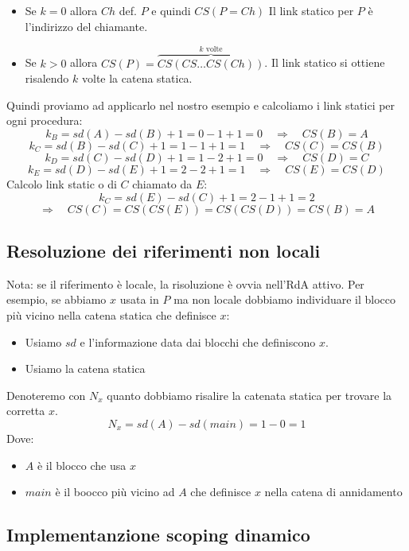 \documentclass[a4paper]{article}
\begin{document}
\begin{Example}{}{}
\begin{itemize}
\[  \]
  \begin{itemize}
    \item Se $k = 0$ allora $Ch$ def. $P$ e quindi $CS(P = Ch)$
    Il link statico per $P$ è l'indirizzo del chiamante.
    \item Se $k > 0$ allora $CS(P) = \overbrace{CS(CS \dots CS(Ch))}^{k \text{ volte}}$.
    Il link statico si ottiene risalendo $k$ volte la catena statica.
  \end{itemize}
\end{itemize}
Quindi proviamo ad applicarlo nel nostro esempio e calcoliamo i link statici 
per ogni procedura:
\[
  k_B = sd(A) - sd(B) + 1 = 0 - 1 + 1 = 0 \quad \Rightarrow \quad CS(B) = A
\]
\[
  k_C = sd(B) - sd(C) + 1 = 1 - 1 + 1 = 1 \quad \Rightarrow \quad CS(C) = CS(B)
\]
\[
  k_D = sd(C) - sd(D) + 1 = 1 - 2 + 1 = 0 \quad \Rightarrow \quad CS(D) = C
\]
\[
  k_E = sd(D) - sd(E) + 1 = 2 - 2 + 1 = 1 \quad \Rightarrow \quad CS(E) = CS(D)
\]
Calcolo link static o di $C$ chiamato da $E$: 
\[
  k_C = sd(E) - sd(C) + 1 = 2 - 1 + 1 = 2 
\]
\[
  \Rightarrow \quad CS(C) = CS(CS(E)) = CS(CS(D)) = CS(B) = A
\]
\end{Example}

\subsection{Resoluzione dei riferimenti non locali}

Nota: se il riferimento è locale, la risoluzione è ovvia nell'RdA attivo.
Per esempio, se abbiamo $x$ usata in $P$ ma non locale dobbiamo  
individuare il blocco più vicino nella catena statica che definisce $x$:
\begin{itemize}
  \item Usiamo $sd$ e l'informazione data dai blocchi che definiscono $x$. 
  \item Usiamo la catena statica 
\end{itemize}
Denoteremo con $N_x$ quanto dobbiamo risalire la catenata statica per trovare la corretta $x$.
\[N_x = sd(A) - sd(main) = 1 - 0 = 1\]
Dove:
\begin{itemize}
  \item $A$ è il blocco che usa $x$
  \item $main$ è il boocco più vicino ad $A$ che definisce $x$ nella catena di annidamento
\end{itemize}

\subsection{Implementanzione scoping dinamico}
\end{document}
